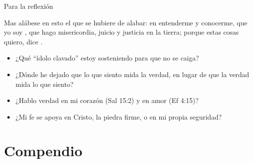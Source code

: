 \begin{frame}{Para la reflexión}
\begin{cita}Mas alábese en esto el que se hubiere de alabar: en entenderme y conocerme, que yo soy \SENOR{}, que hago misericordia, juicio y justicia en la tierra; porque estas cosas quiero, dice \SENOR{}.\end{cita}
\small
\begin{itemize}
\item ¿Qué ``ídolo clavado'' estoy sosteniendo para que no se caiga?
\item ¿Dónde he dejado que lo que siento mida la verdad, en lugar de que la verdad mida lo que siento?
\item ¿Hablo verdad en mi corazón (Sal 15:2) y en amor (Ef 4:15)?
\item ¿Mi fe se apoya en Cristo, la piedra firme, o en mi propia seguridad?
\end{itemize}
\end{frame}

\section{Compendio}

